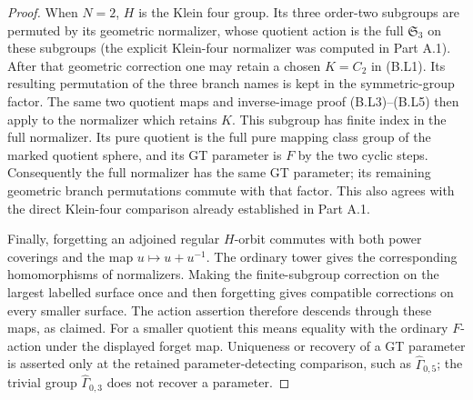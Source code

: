 \begin{proof}
When $N=2$, $H$ is the Klein four group.  Its three order-two
subgroups are permuted by its geometric normalizer, whose
quotient action is the full $\mathfrak S_3$ on these subgroups
(the explicit Klein-four normalizer was computed in Part A.1).
After that geometric correction one may retain a chosen
$K=C_2$ in (B.L1).  Its resulting permutation of the three
branch names is kept in the symmetric-group factor.  The
same two quotient maps and inverse-image proof (B.L3)--(B.L5)
then apply to the normalizer which retains $K$.  This subgroup
has finite index in the full normalizer.  Its pure quotient
is the full pure mapping class group of the marked quotient
sphere, and its GT parameter is $F$ by the two cyclic steps.
Consequently the full normalizer has the same GT parameter;
its remaining geometric branch permutations commute with
that factor.  This also agrees with the direct Klein-four
comparison already established in Part A.1.

Finally, forgetting an adjoined regular $H$-orbit commutes
with both power coverings and the map $u\mapsto u+u^{-1}$.
The ordinary tower gives the corresponding homomorphisms of
normalizers.  Making the finite-subgroup correction on the
largest labelled surface once and then forgetting gives
compatible corrections on every smaller surface.  The
action assertion therefore descends through these maps, as claimed.
For a smaller quotient this means equality with the ordinary
$F$-action under the displayed forget map.  Uniqueness or
recovery of a GT parameter is asserted only at the retained
parameter-detecting comparison, such as
$\widehat\Gamma_{0,5}$; the trivial group
$\widehat\Gamma_{0,3}$ does not recover a parameter.
\end{proof}
